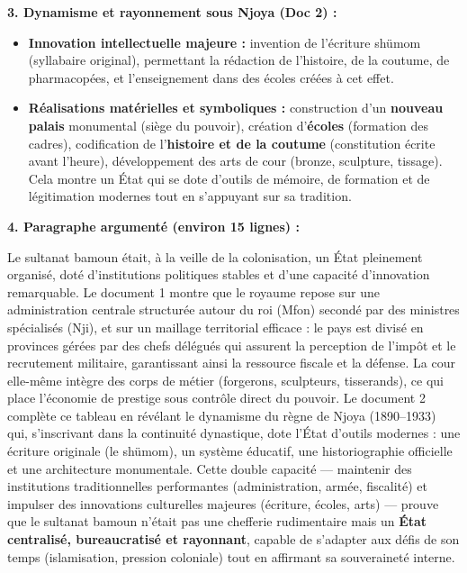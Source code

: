\documentclass[11pt]{article}
\newcommand{\cle}[1]{{\popxbold\color{popdark}#1}}
\begin{document}
\begin{corrige}
\textbf{3. Dynamisme et rayonnement sous Njoya (Doc 2) :}
\begin{itemize}
\item \textbf{Innovation intellectuelle majeure :} invention de l'écriture \cle{shümom} (syllabaire original), permettant la rédaction de l'histoire, de la coutume, de pharmacopées, et l'enseignement dans des écoles créées à cet effet.
\item \textbf{Réalisations matérielles et symboliques :} construction d'un \textbf{nouveau palais} monumental (siège du pouvoir), création d'\textbf{écoles} (formation des cadres), codification de l'\textbf{histoire et de la coutume} (constitution écrite avant l'heure), développement des arts de cour (bronze, sculpture, tissage). Cela montre un État qui se dote d'outils de mémoire, de formation et de légitimation modernes tout en s'appuyant sur sa tradition.
\end{itemize}

\textbf{4. Paragraphe argumenté (environ 15 lignes) :}

Le sultanat bamoun était, à la veille de la colonisation, un État pleinement organisé, doté d'institutions politiques stables et d'une capacité d'innovation remarquable. Le document 1 montre que le royaume repose sur une administration centrale structurée autour du roi (Mfon) secondé par des ministres spécialisés (Nji), et sur un maillage territorial efficace : le pays est divisé en provinces gérées par des chefs délégués qui assurent la perception de l'impôt et le recrutement militaire, garantissant ainsi la ressource fiscale et la défense. La cour elle-même intègre des corps de métier (forgerons, sculpteurs, tisserands), ce qui place l'économie de prestige sous contrôle direct du pouvoir. Le document 2 complète ce tableau en révélant le dynamisme du règne de Njoya (1890–1933) qui, s'inscrivant dans la continuité dynastique, dote l'État d'outils modernes : une écriture originale (le shümom), un système éducatif, une historiographie officielle et une architecture monumentale. Cette double capacité — maintenir des institutions traditionnelles performantes (administration, armée, fiscalité) et impulser des innovations culturelles majeures (écriture, écoles, arts) — prouve que le sultanat bamoun n'était pas une chefferie rudimentaire mais un \textbf{État centralisé, bureaucratisé et rayonnant}, capable de s'adapter aux défis de son temps (islamisation, pression coloniale) tout en affirmant sa souveraineté interne.
\end{corrige}
\end{document}
